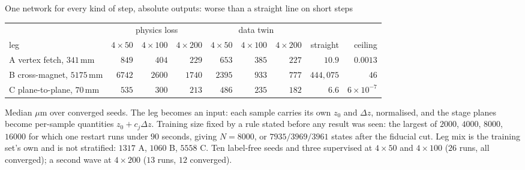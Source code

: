 \documentclass[aspectratio=169,10pt]{beamer}
\newcommand{\mm}{\ensuremath{\,\mathrm{mm}}}
\newcommand{\hl}[1]{{\color{accent}\textbf{#1}}}
\begin{document}
\begin{frame}[shrink=25]{One network for every kind of step, absolute outputs: worse than a straight line on short steps}
  \vspace{2mm}
  \centering\small
  \begin{tabular}{@{}lrrrrrrrr@{}}
    \toprule
    & \multicolumn{3}{c}{physics loss} & \multicolumn{3}{c}{data twin} & & \\
    \cmidrule(lr){2-4}\cmidrule(lr){5-7}
    leg & $4\times50$ & $4\times100$ & $4\times200$ & $4\times50$ & $4\times100$ & $4\times200$ & straight & ceiling \\
    \midrule
    A vertex fetch, $341\mm$   & $849$  & $404$  & $229$  & $653$  & $385$ & $227$ & \hl{$10.9$}  & $0.0013$ \\
    B cross-magnet, $5175\mm$  & $6742$ & $2600$ & $1740$ & $2395$ & $933$ & $777$ & $444{,}075$ & $46$ \\
    C plane-to-plane, $70\mm$  & $535$  & $300$  & $213$  & $486$  & $235$ & $182$ & \hl{$6.6$}   & $6\times10^{-7}$ \\
    \bottomrule
  \end{tabular}
  \vspace{1mm}

  {\scriptsize Median $\mu$m over converged seeds. The leg becomes an input:
   each sample carries its own $z_0$ and $\Delta z$, normalised, and the stage
   planes become per-sample quantities $z_0 + c_j \Delta z$. Training size fixed
   by a rule stated before any result was seen: the largest of $2000$, $4000$,
   $8000$, $16000$ for which one restart runs under $90$ seconds, giving
   $N = 8000$, or $7935 / 3969 / 3961$ states after the fiducial cut. Leg mix is
   the training set's own and is not stratified: $1317$ A, $1060$ B, $5558$ C.
   Ten label-free seeds and three supervised at $4\times50$ and $4\times100$
   ($26$ runs, all converged); a second wave at $4\times200$ ($13$ runs, $12$
   converged).}
  \vspace{2mm}


\end{frame}
\end{document}

